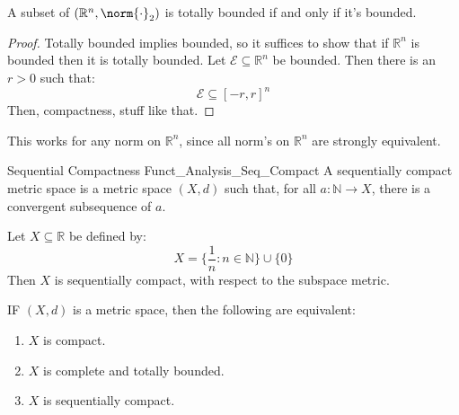 \documentclass[crop=false,class=book,oneside]{standalone}                      %
\begin{document}
            \begin{theorem}
                A subset of $(\mathbb{R}^{n},\norm{\cdot}_{2})$
                is totally bounded if and only if it's bounded.
            \end{theorem}
            \begin{proof}
                Totally bounded implies bounded, so it suffices
                to show that if $\mathbb{R}^{n}$ is bounded then
                it is totally bounded. Let
                $\mathcal{E}\subseteq\mathbb{R}^{n}$ be bounded.
                Then there is an $r>0$ such that:
                \begin{equation}
                    \mathcal{E}\subseteq[-r,r]^{n}
                \end{equation}
                Then, compactness, stuff like that.
            \end{proof}
            This works for any norm on $\mathbb{R}^{n}$, since all
            norm's on $\mathbb{R}^{n}$ are strongly equivalent.
            \begin{ldefinition}{Sequential Compactness}
                  {Funct_Analysis_Seq_Compact}
                A sequentially compact metric space is a metric
                space $(X,d)$ such that, for all
                $a:\mathbb{N}\rightarrow{X}$, there is a convergent
                subsequence of $a$.
            \end{ldefinition}
            \begin{lexample}
                Let $X\subseteq\mathbb{R}$ be defined by:
                \begin{equation}
                    X=\{\frac{1}{n}:n\in\mathbb{N}\}\cup\{0\}
                \end{equation}
                Then $X$ is sequentially compact, with respect
                to the subspace metric.
            \end{lexample}
            \begin{theorem}
                IF $(X,d)$ is a metric space, then the following are
                equivalent:
                \begin{enumerate}
                    \item $X$ is compact.
                    \item $X$ is complete and totally bounded.
                    \item $X$ is sequentially compact.
                \end{enumerate}
            \end{theorem}
\end{document}
